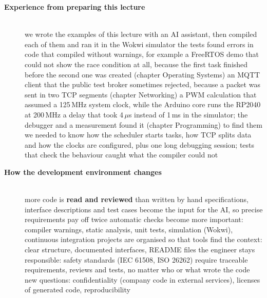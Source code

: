 \begin{description}
\item[{\rot\bf Experience from preparing this lecture}]~\\[-\lblskip]
\bi
	\ite we wrote the examples of this lecture with an AI assistant, then compiled each of them and ran it in the Wokwi simulator
	\ite the tests found errors in code that compiled without warnings, for example
	\bi
		\ite a FreeRTOS demo that could not show the race condition at all, because the first task finished before the second one was created (chapter Operating Systems)
		\ite an MQTT client that the public test broker sometimes rejected, because a packet was sent in two TCP segments (chapter Networking)
		\ite a PWM calculation that assumed a 125\,MHz system clock, while the Arduino core runs the RP2040 at 200\,MHz
		\ite a delay that took 4\,$\mu$s instead of 1\,ms in the simulator; the debugger and a measurement found it (chapter Programming)
	\ei
	\ite to find them we needed to know how the scheduler starts tasks, how TCP splits data and how the clocks are configured, plus one long debugging session; tests that check the behaviour caught what the compiler could not
\ei
\os{\newpage}

\item[{\rot\bf How the development environment changes}]~\\[-\lblskip]
\bi
	\ite more code is \textbf{read and reviewed} than written by hand
	\ite specifications, interface descriptions and test cases become the input for the AI, so precise requirements pay off twice
	\ite automatic checks become more important: compiler warnings, static analysis, unit tests, simulation (Wokwi), continuous integration
	\ite projects are organised so that tools find the context: clear structure, documented interfaces, README files
	\ite the engineer stays responsible: safety standards (IEC 61508, ISO 26262) require traceable requirements, reviews and tests, no matter who or what wrote the code
	\ite new questions: confidentiality (company code in external services), licenses of generated code, reproducibility
\ei
\os{\newpage}


\end{description}
